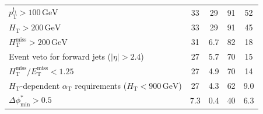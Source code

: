 \begin{table}[H]
{\begin{tabular}{lcccc}
   $p_{\mathrm{T}}^{\mathrm{j_1}} > 100\,\mathrm{GeV}$ & \phantom{1}33\phantom{.1} & \phantom{1}29\phantom{.1} & \phantom{1}91\phantom{.1} & \phantom{1}52\phantom{.1} \\
   $H_{\mathrm{T}} > 200\,\mathrm{GeV}$  & \phantom{1}33\phantom{.1} & \phantom{1}29\phantom{.1} & \phantom{1}91\phantom{.1} & \phantom{1}45\phantom{.1} \\
   $H_{\mathrm{T}}^{\mathrm{miss}} > 200\,\mathrm{GeV}$  & \phantom{1}31\phantom{.1} & \phantom{10}6.7 & \phantom{1}82\phantom{.1} & \phantom{1}18\phantom{.1} \\
  Event veto for forward jets ($|\eta| > 2.4$) & \phantom{1}27\phantom{.1} & \phantom{10}5.7 & \phantom{1}70\phantom{.1} & \phantom{1}15\phantom{.1} \\
  $H_{\mathrm{T}}^{\mathrm{miss}} / E_{\mathrm{T}}^{\mathrm{miss}} < 1.25$ & \phantom{1}27\phantom{.1} & \phantom{10}4.9 & \phantom{1}70\phantom{.1} & \phantom{1}14\phantom{.1} \\
  $H_{\mathrm{T}}$-dependent $\alpha_{\mathrm{T}}$ requirements ($H_{\mathrm{T}} < 900\,\mathrm{GeV}$)  &  \phantom{1}27\phantom{.1} & \phantom{10}4.3 & \phantom{1}62\phantom{.1} & \phantom{10}9.0 \\
  $\Delta\phi^{*}_{\mathrm{min}} > 0.5$  & \phantom{10}7.3 & \phantom{10}0.4 & \phantom{1}40\phantom{.1} & \phantom{10}6.3 \\
  \hline
\end{tabular}
}
\end{table}

